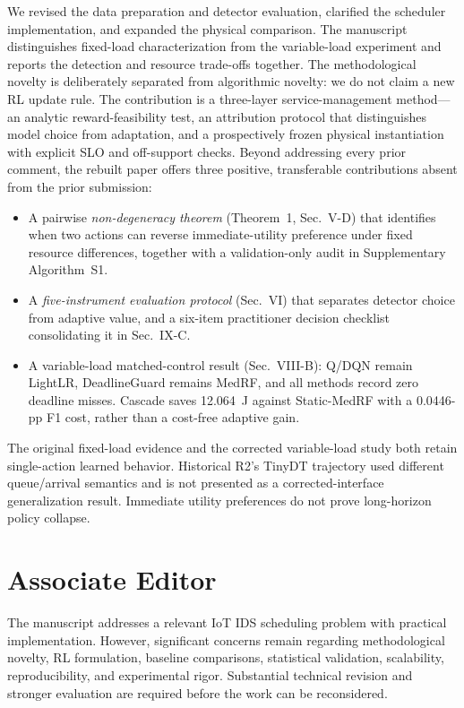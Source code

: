 \documentclass[10pt,a4paper]{article}
\begin{document}
We revised the data preparation and detector evaluation, clarified the scheduler implementation, and expanded the physical comparison. The manuscript distinguishes fixed-load characterization from the variable-load experiment and reports the detection and resource trade-offs together. The methodological novelty is deliberately separated from algorithmic novelty: we do not claim a new RL update rule. The contribution is a three-layer service-management method---an analytic reward-feasibility test, an attribution protocol that distinguishes model choice from adaptation, and a prospectively frozen physical instantiation with explicit SLO and off-support checks. Beyond addressing every prior comment, the rebuilt paper offers three positive, transferable contributions absent from the prior submission:
\begin{itemize}
    \item A pairwise \emph{non-degeneracy theorem} (Theorem~1, Sec.~V-D) that identifies when two actions can reverse immediate-utility preference under fixed resource differences, together with a validation-only audit in Supplementary Algorithm~S1.
    \item A \emph{five-instrument evaluation protocol} (Sec.~VI) that separates detector choice from adaptive value, and a six-item practitioner decision checklist consolidating it in Sec.~IX-C.
    \item A variable-load matched-control result (Sec.~VIII-B): Q/DQN remain LightLR, DeadlineGuard remains MedRF, and all methods record zero deadline misses. Cascade saves 12.064~J against Static-MedRF with a 0.0446-pp F1 cost, rather than a cost-free adaptive gain.
\end{itemize}
The original fixed-load evidence and the corrected variable-load study both retain single-action learned behavior. Historical R2's TinyDT trajectory used different queue/arrival semantics and is not presented as a corrected-interface generalization result. Immediate utility preferences do not prove long-horizon policy collapse.



\section*{Associate Editor}

\begin{rcommentbox}
The manuscript addresses a relevant IoT IDS scheduling problem with practical implementation. However, significant concerns remain regarding methodological novelty, RL formulation, baseline comparisons, statistical validation, scalability, reproducibility, and experimental rigor. Substantial technical revision and stronger evaluation are required before the work can be reconsidered.
\end{rcommentbox}
\end{document}

